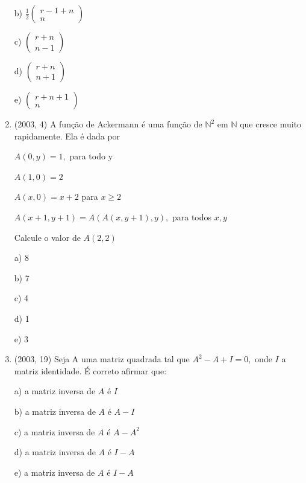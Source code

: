 \documentclass{article}
\begin{document}
\begin{enumerate}
b) $\frac{1}{2}\left(\begin{array}{c}{r-1+n} \\ {n}\end{array}\right)$

c) $\left(\begin{array}{c}{r+n} \\ {n-1}\end{array}\right)$

d) $\left(\begin{array}{l}{r+n} \\ {n+1}\end{array}\right)$

e) $\left(\begin{array}{c}{r+n+1} \\ {n}\end{array}\right)$




\item(2003, 4) A função de Ackermann é uma função de $\mathbb{N}^{2}$ em $\mathbb{N}$ que cresce muito rapidamente. Ela é dada por 

$A(0, y)=1,$ para todo $\mathrm{y}$

$A(1,0)=2$

$A(x, 0)=x+2$ para $x \geq 2$

$A(x+1, y+1)=A(A(x, y+1), y),$ para todos $x, y$

Calcule o valor de $A(2,2)$

a) 8

b) 7

c) 4

d) 1

e) 3\newline








\item(2003, 19) Seja A uma matriz quadrada tal que $ A^{2}-A+I=0,$  onde  $I$ a matriz identidade. É correto afirmar que: 

a) a matriz inversa de $A$ é $I$

b) a matriz inversa de $A$ é $A-I$

c) a matriz inversa de $A$ é $A-A^{2}$

d) a matriz inversa de $A$ é $I-A$

e) a matriz inversa de $A$ é $I-A$ \newline







\end{enumerate}
\end{document}
